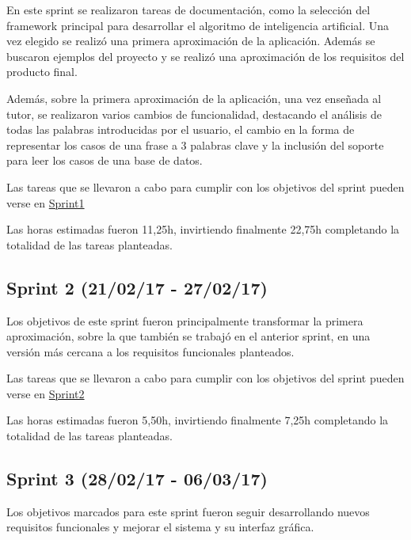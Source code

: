 En este sprint se realizaron tareas de documentación, como la selección del framework principal para desarrollar el algoritmo de inteligencia artificial. Una vez elegido se realizó una primera aproximación de la aplicación. Además se buscaron ejemplos del proyecto y se realizó una aproximación de los requisitos del producto final.

Además, sobre la primera aproximación de la aplicación, una vez enseñada al tutor, se realizaron varios cambios de funcionalidad, destacando el análisis de todas las palabras introducidas por el usuario, el cambio en la forma de representar los casos de una frase a 3 palabras clave y la inclusión del soporte para leer los casos de una base de datos.

Las tareas que se llevaron a cabo para cumplir con los objetivos del sprint pueden verse en \href{https://github.com/DanielSantidrian/UBUassistant/milestone/4?closed=1}{Sprint1}

Las horas estimadas fueron 11,25h, invirtiendo finalmente 22,75h completando la totalidad de las tareas planteadas.


\subsection{Sprint 2 (21/02/17 - 27/02/17)}

Los objetivos de este sprint fueron principalmente transformar la primera aproximación, sobre la que también se trabajó en el anterior sprint, en una versión más cercana a los requisitos funcionales planteados.

Las tareas que se llevaron a cabo para cumplir con los objetivos del sprint pueden verse en \href{https://github.com/DanielSantidrian/UBUassistant/milestone/5?closed=1}{Sprint2}

Las horas estimadas fueron 5,50h, invirtiendo finalmente 7,25h completando la totalidad de las tareas planteadas.


\subsection{Sprint 3 (28/02/17 - 06/03/17)}

Los objetivos marcados para este sprint fueron seguir desarrollando nuevos requisitos funcionales y mejorar el sistema y su interfaz gráfica.

